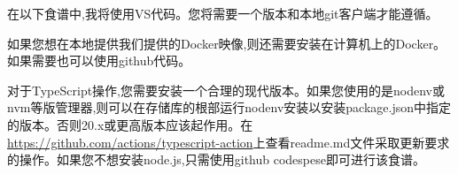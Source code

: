 
在以下食谱中,我将使用VS代码。您将需要一个版本和本地git客户端才能遵循。

如果您想在本地提供我们提供的Docker映像,则还需要安装在计算机上的Docker。如果需要也可以使用github代码。

对于TypeScript操作,您需要安装一个合理的现代版本。如果您使用的是nodenv或nvm等版管理器,则可以在存储库的根部运行nodenv安装以安装package.json中指定的版本。否则20.x或更高版本应该起作用。在\url{https://github.com/actions/typescript-action}上查看readme.md文件采取更新要求的操作。如果您不想安装node.js,只需使用github codespese即可进行该食谱。